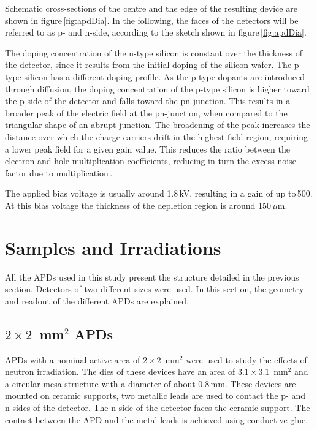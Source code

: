 \documentclass{article}
\begin{document}
Schematic cross-sections of the centre and the edge of the resulting device are shown in figure\,\ref{fig:apdDia}.
In the following, the faces of the detectors will be referred to as p- and n-side, according to the sketch shown in figure\,\ref{fig:apdDia}.

The doping concentration of the n-type silicon is constant over the thickness of the detector, since it results from the initial doping of the silicon wafer.
The p-type silicon has a different doping profile.
As the p-type dopants are introduced through diffusion, the doping concentration of the p-type silicon is higher toward the p-side of the detector and falls toward the pn-junction.
This results in a broader peak of the electric field at the pn-junction, when compared to the triangular shape of an abrupt junction.
The broadening of the peak increases the distance over which the charge carriers drift in the highest field region, requiring a lower peak field for a given gain value.
This reduces the ratio between the electron and hole multiplication coefficients, reducing in turn the excess noise factor due to multiplication\,\cite{theoryDDAPD}.

The applied bias voltage is usually around 1.8\,kV, resulting in a gain of up to\,500.
At this bias voltage the thickness of the depletion region is around 150\,$\mu$m.


\section{Samples and Irradiations}
\label{sec:samples}

All the APDs used in this study present the structure detailed in the previous section.
Detectors of two different sizes were used.
In this section, the geometry and readout of the different APDs are explained.

\subsection{$2 \times 2$~mm$^2$ APDs}

APDs with a nominal active area of $2 \times 2$~mm$^2$ were used to study the effects of neutron irradiation.
The dies of these devices have an area of $3.1 \times 3.1$~mm$^2$ and a circular mesa structure with a diameter of about 0.8\,mm.
These devices are mounted on ceramic supports, two metallic leads are used to contact the p- and n-sides of the detector.
The n-side of the detector faces the ceramic support.
The contact between the APD and the metal leads is achieved using conductive glue.
\end{document}
